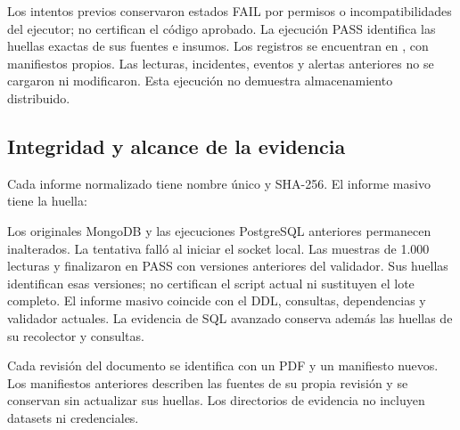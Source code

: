 Los intentos previos conservaron estados FAIL por permisos o incompatibilidades
del ejecutor; no certifican el código aprobado. La ejecución PASS identifica las
huellas exactas de sus fuentes e insumos. Los registros se encuentran en
, con manifiestos propios. Las
lecturas, incidentes, eventos y alertas anteriores no se cargaron ni modificaron.
Esta ejecución no demuestra almacenamiento distribuido.

\subsection{Integridad y alcance de la evidencia}
Cada informe normalizado tiene nombre único y SHA-256. El informe masivo tiene
la huella:
\begin{center}
\small{}
\end{center}
Los originales MongoDB y las ejecuciones PostgreSQL anteriores permanecen
inalterados. La tentativa  falló al iniciar
el socket local. Las muestras de 1.000 lecturas
 y
 finalizaron en PASS con versiones
anteriores del validador. Sus huellas identifican esas versiones; no certifican
el script actual ni sustituyen el lote completo. El informe masivo
 coincide con el DDL, consultas,
dependencias y validador actuales. La evidencia de SQL avanzado conserva
además las huellas de su recolector y consultas.

Cada revisión del documento se identifica con un PDF y un manifiesto nuevos.
Los manifiestos anteriores describen las fuentes de su propia revisión y se
conservan sin actualizar sus huellas. Los directorios de evidencia no incluyen
datasets ni credenciales.
